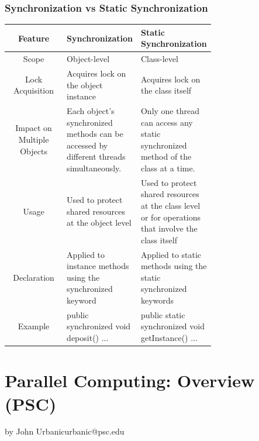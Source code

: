 \documentclass[12pt, a4paper]{book}
\begin{document}
\subsection{Synchronization vs Static Synchronization}

\begin{tabular}{c|p{0.35\linewidth}|p{0.35\linewidth}}
    Feature                    & \textbf{Synchronization}                                                                & \textbf{Static Synchronization}                                                                     \\
    \hline
    Scope                      & Object-level                                                                            & Class-level                                                                                         \\
    \hline
    Lock Acquisition           & Acquires lock on the object instance                                                    & Acquires lock on the class itself                                                                   \\
    \hline
    Impact on Multiple Objects & Each object's synchronized methods can be accessed by different threads simultaneously. & Only one thread can access any static synchronized method of the class at a time.                   \\
    \hline
    Usage                      & Used to protect shared resources at the object level                                    & Used to protect shared resources at the class level or for operations that involve the class itself \\
    \hline
    Declaration                & Applied to instance methods using the synchronized keyword                              & Applied to static methods using the static synchronized keywords                                    \\
    \hline
    Example                    & public synchronized void deposit() { ... }                                              & public static synchronized void getInstance() { ... }                                               \\
\end{tabular}
\chapter{Parallel Computing: Overview (PSC)}{by John Urbanicurbanic@psc.edu}
\end{document}
